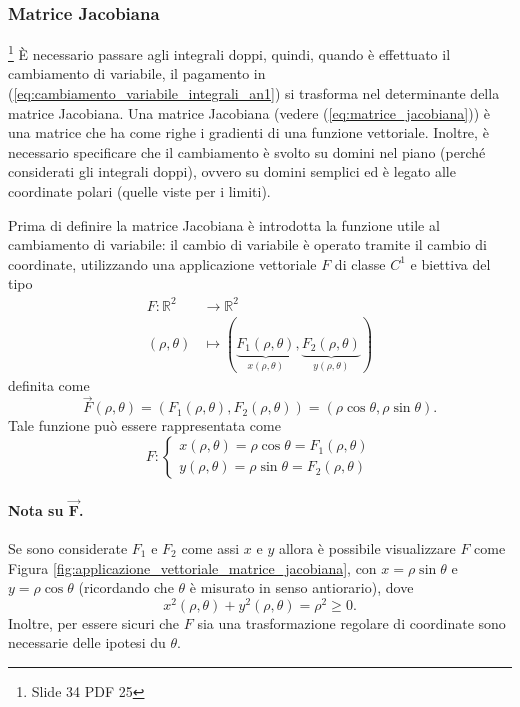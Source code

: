 \subsubsection{Matrice Jacobiana}\footnote{Slide 34 PDF 25}
È necessario passare agli integrali doppi, quindi, quando è effettuato il cambiamento di variabile, il pagamento in (\ref{eq:cambiamento_variabile_integrali_an1}) si trasforma nel determinante della matrice Jacobiana. Una matrice Jacobiana (vedere (\ref{eq:matrice_jacobiana})) è una matrice che ha come righe i gradienti di una funzione vettoriale. Inoltre, è necessario specificare che il cambiamento è svolto su domini nel piano (perché considerati gli integrali doppi), ovvero su domini semplici ed è legato alle coordinate polari (quelle viste per i limiti).

Prima di definire la matrice Jacobiana è introdotta la funzione utile al cambiamento di variabile: il cambio di variabile è operato tramite il cambio di coordinate, utilizzando una applicazione vettoriale $F$ di classe $C^1$ e biettiva del tipo
\begin{equation*}
	\begin{aligned}
		F:\mathbb{R}^2 &\rightarrow\mathbb{R}^2\\
			(\rho, \theta) &\mapsto (\underbrace{F_1(\rho, \theta)}_{x(\rho, \theta)}, \underbrace{F_2(\rho, \theta)}_{y(\rho, \theta)})
	\end{aligned}
\end{equation*}
definita come
\begin{equation*}
	\vec{F}(\rho, \theta)=(F_1(\rho, \theta), F_2(\rho, \theta)) = (\rho\cos\theta, \rho\sin\theta).
\end{equation*}
Tale funzione può essere rappresentata come
\begin{equation}\label{eq:trasformazione_F}
	F\colon
	\begin{cases}
		x(\rho, \theta) = \rho \cos\theta = F_1(\rho, \theta)\\
		y(\rho, \theta) = \rho \sin\theta = F_2(\rho, \theta)
	\end{cases}
\end{equation}

\paragraph{Nota su \texorpdfstring{$\boldsymbol{\vec{F}}$}{F}.} Se sono considerate $F_1$ e $F_2$ come assi $x$ e $y$ allora è possibile visualizzare $F$ come Figura \ref{fig:applicazione_vettoriale_matrice_jacobiana}, con $x=\rho\sin\theta$ e $y=\rho\cos\theta$ (ricordando che $\theta$ è misurato in senso antiorario), dove
\begin{equation*}
	x^2(\rho, \theta) + y^2(\rho, \theta) = \rho^2 \geq 0.
\end{equation*}
Inoltre, per essere sicuri che $F$ sia una trasformazione regolare di coordinate sono necessarie delle ipotesi du $\theta$.

